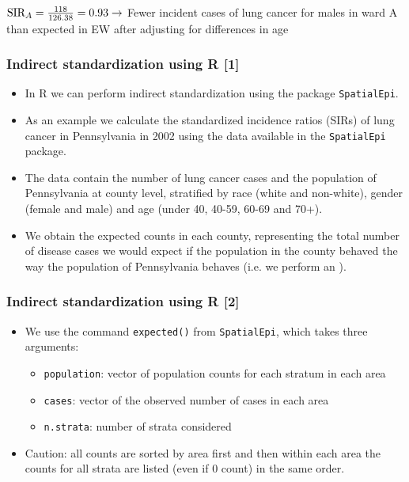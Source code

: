 \documentclass[12pt]{beamer}
\begin{document}
\begin{frame}
\footnotesize{\noindent $\hbox{SIR}_A=\frac{118}{126.38}=0.93 \rightarrow$ Fewer incident cases of lung cancer for males in ward A than expected in EW after adjusting for differences in age}
\end{frame}


\begin{frame}
\frametitle{Indirect standardization using R [1]}
\begin{itemize} \setlength\itemsep{\fill}
  \item In R we can perform indirect standardization using the package \texttt{SpatialEpi}.
  \item As an example we calculate the standardized incidence ratios (SIRs) of lung cancer in Pennsylvania in 2002 using the data available in the \texttt{SpatialEpi} package.
  \item The data contain the number of lung cancer cases and the population of Pennsylvania at county level, stratified by race (white and non-white), gender (female and male) and age (under 40, 40-59, 60-69 and 70+).
  \item We obtain the expected counts in each county, representing the total number of disease cases we would expect if the population in the county behaved the way the population of Pennsylvania behaves (i.e. we perform an \color{cyan}{internal standardization}).
 \end{itemize}
\end{frame}


\begin{frame}
\frametitle{Indirect standardization using R [2]}
\begin{itemize} \setlength\itemsep{\fill}
  \item We use the command \texttt{expected()} from \texttt{SpatialEpi}, which takes three arguments:
\begin{itemize}
\item \texttt{population}: vector of population counts for each stratum in each area
\item \texttt{cases}: vector of the observed number of cases in each area
\item \texttt{n.strata}: number of strata considered
\end{itemize}
\item Caution: all counts are sorted by area first and then within each area the counts for all strata are listed (even if 0 count) in the same order.
\end{itemize}
\end{frame}
\end{document}
